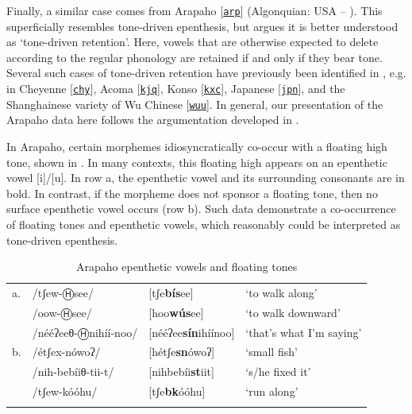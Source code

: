 \documentclass[output=paper,colorlinks,citecolor=brown,draft,draftmode]{langscibook}
\begin{document}
Finally, a similar case comes from Arapaho [\href{https://glottolog.org/resource/languoid/id/arap1274}{\texttt{arp}}] 
(Algonquian: USA -- \citealt{Cowell2008}).
This superficially resembles tone-driven epenthesis, but \citet{gleim2019} argues it is better understood as `tone-driven retention'.
Here, vowels that are otherwise expected to delete according to the regular phonology are retained if and only if they bear tone.
Several such cases of tone-driven retention have previously been identified in 
\citet[279--280]{roettger2019}, e.g. in
Cheyenne 
[\href{https://glottolog.org/resource/languoid/id/chey1247}{\texttt{chy}}],
Acoma 
[\href{https://glottolog.org/resource/languoid/id/west2632}{\texttt{kjq}}],
Konso 
[\href{https://glottolog.org/resource/languoid/id/kons1243}{\texttt{kxc}}],
Japanese 
[\href{https://glottolog.org/resource/languoid/id/nucl1643}{\texttt{jpn}}],
and the Shanghainese variety of Wu Chinese
[\href{https://glottolog.org/resource/languoid/id/wuch1236}{\texttt{wuu}}].
In general, our presentation of the Arapaho data here follows the argumentation developed in \citet{gleim2019}. 

In Arapaho, certain morphemes idiosyncratically co-occur with a floating high tone, shown in .
In many contexts, this floating high  appears on an epenthetic vowel [i]/[u].
In row a, the epenthetic vowel and its surrounding consonants are in bold.
In contrast, if the morpheme does not sponsor a floating tone, then no surface epenthetic vowel occurs (row b).
Such data demonstrate a co-occurrence of floating tones and epenthetic vowels, which reasonably could be interpreted as tone-driven epenthesis.

\begin{table}
\caption{Arapaho epenthetic vowels and floating tones \citep{gleim2019}}
\label{tab:arapaho}
 \begin{tabularx}{\textwidth}{lXXl}
  \lsptoprule
a.&	/tʃew-Ⓗsee/		&		[tʃe\textbf{bís}ee]		&		‘to walk along’\\
&/oow-Ⓗsee/		&		[hoo\textbf{wús}ee]	&		‘to walk downward’\\
&/nééʔeeθ-Ⓗnihíí-noo/ &		[nééʔee\textbf{sín}ihíínoo]	&	‘that’s what I’m saying’\\
b.&	/étʃex-nówoʔ/		&		[hétʃe\textbf{sn}ówoʔ]		&	‘small fish’\\
&/nih-bebíiθ-tii-t/	&		[nihbebíi\textbf{st}iit]		&	‘s/he fixed it’\\
&/tʃew-kóóhu/			&	[tʃe\textbf{bk}óóhu]&			‘run along’\\
\lspbottomrule
\end{tabularx}
\end{table}
\end{document}
